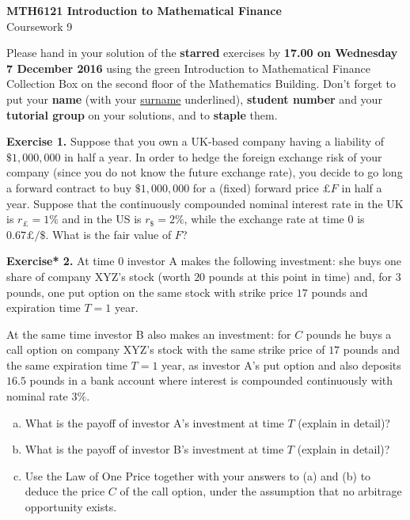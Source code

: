 \documentclass[11pt,a4paper]{report}
\begin{document}
    \begin{center}
            \LARGE\textbf{MTH6121 Introduction to Mathematical Finance}\\
            Coursework 9
    \end{center}
    Please hand in your solution of the \textbf{starred} exercises by \textbf{17.00 on Wednesday 7 December 2016} using the green Introduction to Mathematical Finance Collection Box on the second floor of the Mathematics Building. Don’t forget to put your \textbf{name} (with your \underline{surname} underlined), \textbf{student number} and your \textbf{tutorial group} on your solutions, and to \textbf{staple} them.\par 
    \textbf{Exercise 1.} Suppose that you own a UK-based company having a liability of $\$ 1,000,000$ in half a year. In order to hedge the foreign exchange risk of your company (since you do not know the future exchange rate), you decide to go long a forward contract to buy $\$ 1,000,000$ for a (fixed) forward price $\pounds F$ in half a year. Suppose that the continuously compounded nominal interest rate in the UK is $r_{\pounds} = 1\%$ and in the US is $r_{\$} = 2\% $, while the exchange rate at time $0$ is $0.67\pounds / \$$. What is the fair value of $F$?\par 
    \textbf{Exercise* 2.} At time $0$ investor A makes the following investment: she buys one share of company XYZ’s stock (worth $20$ pounds at this point in time) and, for $3$ pounds, one put option on the same stock with strike price $17$ pounds and expiration time $T = 1$ year.\par
    At the same time investor B also makes an investment: for $C$ pounds he buys a call option on company XYZ’s stock with the same strike price of $17$ pounds and the same expiration time $T = 1$ year, as investor A’s put option and also deposits $16.5$ pounds in a bank account where interest is compounded continuously with nominal rate $3\%$.
    \begin{enumerate}[(a)]
        \item What is the payoff of investor A’s investment at time $T$ (explain in detail)?
        \item What is the payoff of investor B’s investment at time $T$ (explain in detail)?
        \item Use the Law of One Price together with your answers to (a) and (b) to deduce the price $C$ of the call option, under the assumption that no arbitrage opportunity exists.
    \end{enumerate}
\end{document}
